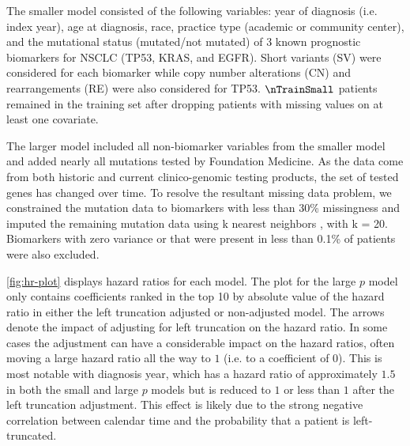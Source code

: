 \documentclass[11pt,final,fleqn]{article}\usepackage[]{graphicx}\usepackage[]{color}
\theoremstyle{plain}
\begin{document}
The smaller model consisted of the following variables: year of diagnosis (i.e. index year), age at diagnosis, race, practice type (academic or community center), and the mutational status (mutated/not mutated) of 3 known prognostic biomarkers for NSCLC (TP53, KRAS, and EGFR). Short variants (SV) were considered for each biomarker while copy number alterations (CN) and rearrangements (RE) were also considered for TP53. $\nTrainSmall$ patients remained in the training set after dropping patients with missing values on at least one covariate. 

The larger model included all non-biomarker variables from the smaller model and added nearly all mutations tested by Foundation Medicine. As the data come from both historic and current clinico-genomic testing products, the set of tested genes has changed over time. To resolve the resultant missing data problem, we constrained the mutation data to biomarkers with less than 30\% missingness and imputed the remaining mutation data using k nearest neighbors \cite{troyanskaya_missing_2001}, with k = 20. Biomarkers with zero variance or that were present in less than 0.1\% of patients were also excluded.

\autoref{fig:hr-plot} displays hazard ratios for each model. The plot for the large $p$ model only contains coefficients ranked in the top 10 by absolute value of the hazard ratio in either the left truncation adjusted or non-adjusted model.  The arrows denote the impact of adjusting for left truncation on the hazard ratio. In some cases the adjustment can have a considerable impact on the hazard ratios, often moving a large hazard ratio all the way to $1$ (i.e. to a coefficient of $0$). This is most notable with diagnosis year, which has a hazard ratio of approximately $1.5$ in both the small and large $p$ models but is reduced to $1$ or less than $1$ after the left truncation adjustment. This effect is likely due to the strong negative correlation between calendar time and the probability that a patient is left-truncated. 
\end{document}

